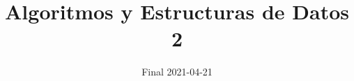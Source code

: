

\title{Algoritmos y Estructuras de Datos 2}
\author{Final 2021-04-21}
\date{}



\maketitle








